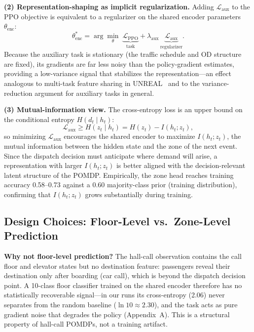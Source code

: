 \documentclass{ieeeaccess}
\begin{document}
\textbf{(2) Representation-shaping as implicit regularization.}
Adding $\mathcal{L}_{\text{aux}}$ to the PPO objective is
equivalent to a regularizer on the shared encoder parameters
$\theta_{\text{enc}}$:
\begin{equation}
\theta_{\text{enc}}^* = \arg\min_\theta\;
\underbrace{\mathcal{L}_{\text{PPO}}}_{\text{task}} +
\lambda_{\text{aux}}\,
\underbrace{\mathcal{L}_{\text{aux}}}_{\text{regularizer}}.
\end{equation}
Because the auxiliary task is stationary (the traffic schedule
and OD structure are fixed), its gradients are far less noisy than the
policy-gradient estimates, providing a low-variance signal that
stabilizes the representation---an effect analogous to
multi-task feature sharing in
UNREAL~\cite{jaderberg2017unreal} and to the variance-reduction
argument for auxiliary tasks in general.

\textbf{(3) Mutual-information view.} The cross-entropy loss is an
upper bound on the conditional entropy $H(d_t \mid h_t)$:
\begin{equation}
\mathcal{L}_{\text{aux}} \geq H(z_t \mid h_t) =
H(z_t) - I(h_t; z_t),
\end{equation}
so minimizing $\mathcal{L}_{\text{aux}}$ encourages the shared
encoder to maximize $I(h_t; z_t)$, the mutual information between
the hidden state and the zone of the next event. Since the dispatch
decision must anticipate where demand will arise, a representation
with larger $I(h_t; z_t)$ is better aligned with the
decision-relevant latent structure of the POMDP. Empirically, the
zone head reaches training accuracy 0.58--0.73 against a 0.60
majority-class prior (training distribution), confirming that
$I(h_t; z_t)$ grows substantially during training.

\subsection{Design Choices: Floor-Level vs.\ Zone-Level Prediction}

\textbf{Why not floor-level prediction?} The hall-call observation
contains the call floor and elevator states but no destination
feature: passengers reveal their destination only after boarding
(car call), which is beyond the dispatch decision point. A 10-class
floor classifier trained on the shared encoder therefore has no
statistically recoverable signal---in our runs its cross-entropy
(2.06) never separates from the random baseline ($\ln 10 \approx
2.30$), and the task acts as pure gradient noise that degrades the
policy (Appendix~A). This is a structural property of hall-call
POMDPs, not a training artifact.
\end{document}
